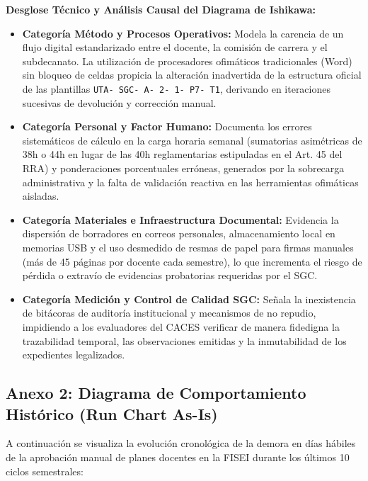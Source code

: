 \documentclass[12pt,a4paper]{article}
\begin{document}
\FloatBarrier

\noindent
\textbf{Desglose Técnico y Análisis Causal del Diagrama de Ishikawa:}
\begin{itemize}[leftmargin=1.5em, itemsep=3pt]
    \item \textbf{Categoría Método y Procesos Operativos:} Modela la carencia de un flujo digital estandarizado entre el docente, la comisión de carrera y el subdecanato. La utilización de procesadores ofimáticos tradicionales (Word) sin bloqueo de celdas propicia la alteración inadvertida de la estructura oficial de las plantillas \texttt{UTA- SGC- A- 2- 1- P7- T1}, derivando en iteraciones sucesivas de devolución y corrección manual.
    \item \textbf{Categoría Personal y Factor Humano:} Documenta los errores sistemáticos de cálculo en la carga horaria semanal (sumatorias asimétricas de 38h o 44h en lugar de las 40h reglamentarias estipuladas en el Art. 45 del RRA) y ponderaciones porcentuales erróneas, generados por la sobrecarga administrativa y la falta de validación reactiva en las herramientas ofimáticas aisladas.
    \item \textbf{Categoría Materiales e Infraestructura Documental:} Evidencia la dispersión de borradores en correos personales, almacenamiento local en memorias USB y el uso desmedido de resmas de papel para firmas manuales (más de 45 páginas por docente cada semestre), lo que incrementa el riesgo de pérdida o extravío de evidencias probatorias requeridas por el SGC.
    \item \textbf{Categoría Medición y Control de Calidad SGC:} Señala la inexistencia de bitácoras de auditoría institucional y mecanismos de no repudio, impidiendo a los evaluadores del CACES verificar de manera fidedigna la trazabilidad temporal, las observaciones emitidas y la inmutabilidad de los expedientes legalizados.
\end{itemize}

\subsection*{Anexo 2: Diagrama de Comportamiento Histórico (Run Chart As-Is)}
A continuación se visualiza la evolución cronológica de la demora en días hábiles de la aprobación manual de planes docentes en la FISEI durante los últimos 10 ciclos semestrales:
\end{document}
